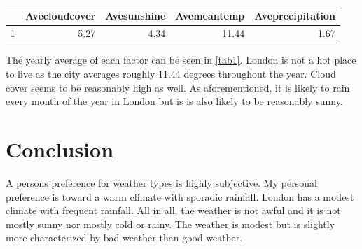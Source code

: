 \documentclass[11pt,preprint, authoryear]{elsarticle}
\let\origtable\table
\let\endorigtable\endtable
\renewenvironment{table}[1][2] {
    \expandafter\origtable\expandafter[H]
} {
    \endorigtable
}
\numberwithin{equation}{section}
\numberwithin{figure}{section}
\numberwithin{table}{section}
\begin{document}
\begin{table}[H]
\centering
\begin{tabular}{rrrrr}
  \hline
 & Avecloudcover & Avesunshine & Avemeantemp & Aveprecipitation \\ 
  \hline
1 & 5.27 & 4.34 & 11.44 & 1.67 \\ 
   \hline
\end{tabular}
\caption{Average values throughout the year \label{tab1}} 
\end{table}

The yearly average of each factor can be seen in \ref{tab1}. London is
not a hot place to live as the city averages roughly 11.44 degrees
throughout the year. Cloud cover seems to be reasonably high as well. As
aforementioned, it is likely to rain every month of the year in London
but is is also likely to be reasonably sunny.

\hypertarget{conclusion}{%
\section{Conclusion}\label{conclusion}}

A persons preference for weather types is highly subjective. My personal
preference is toward a warm climate with sporadic rainfall. London has a
modest climate with frequent rainfall. All in all, the weather is not
awful and it is not mostly sunny nor mostly cold or rainy. The weather
is modest but is slightly more characterized by bad weather than good
weather.

\newpage


\end{document}
